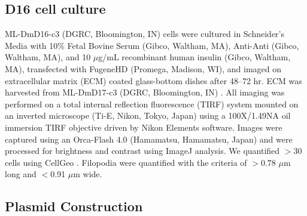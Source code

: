 \subsection{D16 cell culture}\label{ena-mm-cell-culture}

ML-DmD16-c3 (DGRC, Bloomington, IN) cells were cultured in Schneider's Media with 10\% Fetal Bovine Serum (Gibco, Waltham, MA), Anti-Anti (Gibco, Waltham, MA), and 10 $\mu$g/mL recombinant human insulin (Gibco, Waltham, MA), transfected with FugeneHD (Promega, Madison, WI), and imaged on extracellular matrix (ECM) coated glass-bottom dishes after 48–72 hr. ECM was harvested from ML-DmD17-c3 (DGRC, Bloomington, IN) \citep{currie_using_2011}. All imaging was performed on a total internal reflection fluorescence (TIRF) system mounted on an inverted microscope (Ti-E, Nikon, Tokyo, Japan) using a 100X/1.49NA oil immersion TIRF objective driven by Nikon Elements software. Images were captured using an Orca-Flash 4.0 (Hamamatsu, Hamamatsu, Japan) and were processed for brightness and contrast using ImageJ \citep{schneider_nih_2012} analysis. We quantified $>$30 cells using CellGeo \citep{tsygankov_cellgeo:_2014}. Filopodia were quantified with the criteria of $>$0.78 $\mu$m long and $<$0.91 $\mu$m wide. 

\subsection{Plasmid Construction}\label{ena-mm-plasmid}

